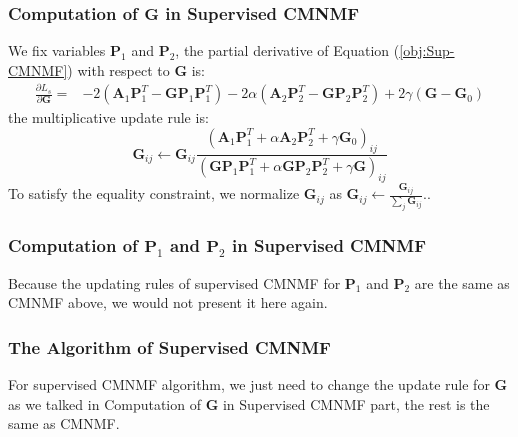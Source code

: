 \documentclass{article}
\begin{document}
\subsubsection*{{Computation of $\bm{G}$ in Supervised CMNMF}}
We fix variables $\bm{P}_1$ and $\bm{P}_2$,
the partial derivative of Equation (\ref{obj:Sup-CMNMF}) with respect to $\bm{G}$ is:
\begin{equation}\label{equ:G_gradient}\nonumber
\begin{split}
\frac{\partial{L_s}}{\partial{\bm{G}}}=
&-2(\bm{A}_1{\bm{P}_1^T} - \bm{G}{\bm{P}_1}{\bm{P}_1^T})-2\alpha(\bm{A}_2{\bm{P}_2^T} - \bm{G}{\bm{P}_2}{\bm{P}_2^T})+2\gamma(\bm{G}-\bm{G}_0)
\end{split}
\end{equation}
the multiplicative update rule is:
\begin{equation}\label{equ:updating_G}\nonumber
\bm{G}_{ij}\leftarrow \bm{G}_{ij}
\frac{(\bm{A}_1\bm{P}_1^T+\alpha \bm{A}_2\bm{P}_2^T+\gamma \bm{G}_0)_{ij}}
{(\bm{GP}_1\bm{P}_1^T+\alpha \bm{GP}_2\bm{P}_2^T+\gamma \bm{G})_{ij}}
\end{equation}
To satisfy the equality constraint, we normalize $\bm{G}_{ij}$ as $\bm{G}_{ij}\leftarrow\frac{\bm{G}_{ij}}{\sum_{j}\bm{G}_{ij}}$..

\subsubsection*{{Computation of $\bm{P}_1$ and $\bm{P}_2$ in Supervised CMNMF}}
Because the updating rules of supervised CMNMF for $\bm{P}_1$ and $\bm{P}_2$ are the same as CMNMF above, we would not present it here again.

\subsubsection*{{The Algorithm of Supervised CMNMF}}

For supervised CMNMF algorithm, we just need to change the update rule for $\bm{G}$ as we talked in \textup{Computation of $\bm{G}$ in Supervised CMNMF} part, the rest is the same as CMNMF.


\end{document}
